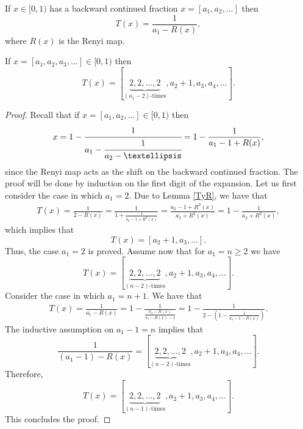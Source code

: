 \documentclass[10pt,a4paper]{amsart}
\begin{document}
 \begin{lemma}\label{TyR}
 If $x \in [0,1)$ has a backward continued fraction $x=[a_1, a_2, \dots]$ then 
\begin{equation}
T(x)=  \frac{1}{a_1 - R(x)},
\end{equation}
where $R(x)$ is the Renyi map. 
 \end{lemma}

 \begin{theorem} \label{action}
 If $x=[a_1, a_2, a_3, \dots] \in [0,1)$ then
 \begin{equation*}
 T(x)=[\underbrace{2,2,\dots,2}_{(a_1-2)\textrm{-times}}, a_2+ 1, a_3, a_4, \dots].
 \end{equation*}
 \end{theorem}

 \begin{proof}
Recall that if $x=[a_1, a_2,  \dots] \in [0,1)$ then
\begin{equation} \label{rep}
x=1- \textrm{ } \cfrac{1}{a_1 - \cfrac{1}{a_2 - \dots}}= 1 - \frac{1}{a_1- 1 + R(x)},
\end{equation}
since the Renyi map acts as the shift on the backward continued fraction.
The proof will be done by induction on the first digit of the expansion.  Let us first consider the case in which $a_1=2$. Due to Lemma \ref{TyR}, we have that
\begin{eqnarray*}
T(x) = \frac{1}{2- R(x)}
= \frac{1}{1 + \frac{1}{a_2-1+R^2(x)}}=
\frac{a_2-1+R^2(x)}{a_2 +R^2(x)}= 1 - \frac{1}{a_2 +R^2(x)},
\end{eqnarray*}
which implies that 
\begin{equation*}
T(x)= [a_2+1, a_3,  \dots].
\end{equation*}
Thus, the case $a_1=2$ is proved. Assume now that for $a_1=n\geq 2$ we have 
\begin{equation*}
T(x)=[\underbrace{2,2,\dots,2}_{(n-2)\textrm{-times}}, a_2+ 1, a_3, a_4, \dots].
\end{equation*}
Consider the case in which 
$a_1=n+1$. We have that
\begin{eqnarray*}
T(x)= \frac{1}{a_1-R(x)}= 1- \frac{1}{\frac{a_1-R(x)}{a_1-R(x)-1}}= 1- \frac{1}{2- \left(1 -\frac{1}{a_1-1-R(x)} \right)}.
\end{eqnarray*}
The inductive assumption on $a_1-1=n$ implies that
\begin{equation*}
\frac{1}{(a_1-1)-R(x)}=[\underbrace{2,2,\dots,2}_{(n-2)\textrm{-times}}, a_2+ 1, a_3, a_4, \dots].
\end{equation*}
Therefore,
\begin{equation*}
T(x)=[ \underbrace{2,2,\dots,2}_{(n-1)\textrm{-times}}, a_2+ 1, a_3, a_4, \dots].
\end{equation*}
This concludes the proof.
\end{proof}
\end{document}
